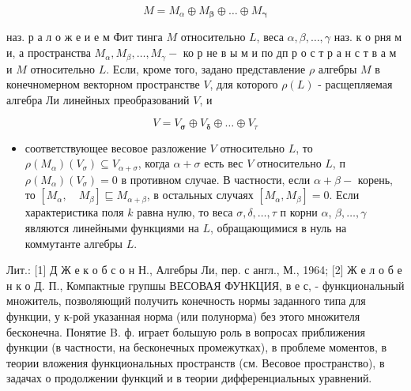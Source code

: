 \documentclass[10pt]{article}
\begin{document}
\[

M=M_{\alpha} \oplus M_{\boldsymbol{\beta}} \oplus \ldots \oplus M_{\boldsymbol{\gamma}}

\]



наз. р а л о ж е и е м Фит тинга $M$ относительно $L$, веса $\alpha, \beta, \ldots, \gamma$ наз. к о рня м и, а пространства $M_{\alpha}, M_{\beta}, \ldots, M_{\gamma}-$ ко р не в ы м и по дп р о с т р а н с т в а м и $M$ относительно $L$. Если, кроме того, задано представление $\rho$ алгебры $M$ в конечномерном векторном пространстве $V$, для которого $\rho(L)$ - расщепляемая алгебра Ли линейных преобразований $V$, и



\[

V=V_{\boldsymbol{\sigma}} \oplus V_{\boldsymbol{\delta}} \oplus \ldots \oplus V_{\tau}

\]



\begin{itemize}

  \item соответствующее весовое разложение $V$ относительно $L$, то $\rho\left(M_{\alpha}\right)\left(V_{\sigma}\right) \subseteq V_{\alpha+\sigma}$, когда $\alpha+\sigma$ есть вес $V$ относительно $L$, п $\rho\left(M_{\alpha}\right)\left(V_{\sigma}\right)=0$ в противном случае. В частности, если $\alpha+\beta-$ корень, то $\left[M_{\alpha}, \quad M_{\beta}\right] \sqsubseteq M_{\alpha+\beta}$, в остальных случаях $\left[M_{\alpha}, M_{\beta}\right]=0$. Если характеристика поля $k$ равна нулю, то веса $\sigma, \delta, \ldots, \tau$ п корни $\alpha$, $\beta, \ldots, \gamma$ являются линейными функциями на $L$, обращающимися в нуль на коммутанте алгебры $L$.

\end{itemize}



Лит.: [1] Д Ж е к о б с о н Н., Алгебры Ли, пер. с англ., М., 1964; [2] Ж е л о б е н к о Д. П., Компактные групшы ВЕСОВАЯ ФУНКЦИЯ, в е с, - функциональный множитель, позволяющий получить конечность нормы заданного типа для функции, у к-рой указанная норма (или полунорма) без этого множителя бесконечна. Понятие B. ф. играет большую роль в вопросах приближения функции (в частности, на бесконечных промежутках), в проблеме моментов, в теории вложения функциональных пространств (см. Весовое пространство), в задачах о продолжении функций и в теории дифференциальных уравнений.
\end{document}
